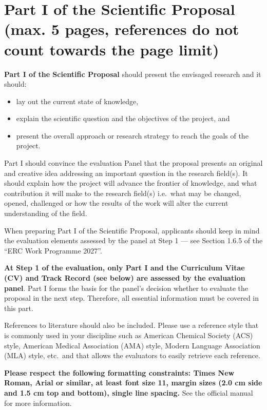 \documentclass[timesnewroman,partone,draftproposal]{erc-stg}
\begin{document}

\maketitle

\section*{Part I of the Scientific Proposal (max. 5 pages, references
do not count towards the page limit)}
\label{sc:synopsis}

\begin{erccomment}
\textbf{Part I of the Scientific Proposal} should present the envisaged research
and it should:
{
\setlength{\leftmargini}{10pt}
\setlength{\itemsep}{0pt}
\begin{itemize}
    \setlength{\parskip}{0pt}
    \item lay out the current state of knowledge,
    \item explain the scientific question and the objectives of the project, and
    \item present the overall approach or research strategy to reach the goals
    of the project.
\end{itemize}
\vspace{-\topsep}
}

Part I should convince the evaluation Panel that the proposal presents an original and
creative idea addressing an important question in the research field(s). It should
explain how the project will advance the frontier of knowledge, and what contribution it
will make to the research field(s) i.e.\ what may be changed, opened, challenged or how
the results of the work will alter the current understanding of the field.

When preparing Part I of the Scientific Proposal, applicants should keep in mind the
evaluation elements assessed by the panel at Step 1 --- see Section 1.6.5 of the ``ERC
Work Programme 2027''.

\textbf{At Step 1 of the evaluation, only Part I and the Curriculum Vitae (CV) and Track
Record (see below) are assessed by the evaluation panel}. Part I forms the basis for the
panel’s decision whether to evaluate the proposal in the next step. Therefore, all
essential information must be covered in this part.

References to literature should also be included. Please use a reference style that is
commonly used in your discipline such as American Chemical Society (ACS) style, American
Medical Association (AMA) style, Modern Language Association (MLA) style, etc.\ and that
allows the evaluators to easily retrieve each reference.

\textbf{Please respect the following formatting constraints: Times New Roman, Arial or
similar, at least font size 11, margin sizes (2.0 cm side and 1.5 cm top and bottom),
single line spacing.} See the official manual~\cite{ERC2026InfoApplicants} for more
information.
\end{erccomment}
\end{document}
